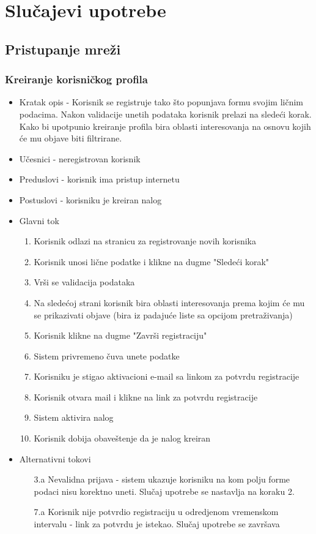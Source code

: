 \section{Slučajevi upotrebe}

\subsection{Pristupanje mreži}
\subsubsection{Kreiranje korisničkog profila}
\begin{itemize}
\item Kratak opis - Korisnik se registruje tako što popunjava formu svojim ličnim podacima. Nakon validacije unetih podataka korisnik prelazi na sledeći korak. Kako bi upotpunio kreiranje profila bira oblasti interesovanja na osnovu kojih će mu objave biti filtrirane.
\item Učesnici - neregistrovan korisnik
\item Preduslovi - korisnik ima pristup internetu
\item Postuslovi - korisniku je kreiran nalog
\item Glavni tok
	\begin{enumerate}
	\item Korisnik odlazi na stranicu za registrovanje novih korisnika
	\item Korisnik unosi lične podatke i klikne na dugme "Sledeći korak"
	\item Vrši se validacija podataka
	\item Na sledećoj strani korisnik bira oblasti interesovanja prema kojim će mu se prikazivati objave (bira iz padajuće liste sa opcijom pretraživanja)
	\item Korisnik klikne na dugme "Završi registraciju"
	\item Sistem privremeno čuva unete podatke
	\item Korisniku je stigao aktivacioni e-mail sa linkom za potvrdu registracije
	\item Korisnik otvara mail i klikne na link za potvrdu registracije
	\item Sistem aktivira nalog
	\item Korisnik dobija obaveštenje da je nalog kreiran
	\end{enumerate}
\item Alternativni tokovi
	\begin{itemize}
	\item[3.a] Nevalidna prijava - sistem ukazuje korisniku na kom polju forme podaci nisu korektno uneti. Slučaj upotrebe se nastavlja na koraku 2.
	\item[7.a] Korisnik nije potvrdio registraciju u odredjenom vremenskom intervalu - link za potvrdu je istekao. Slučaj upotrebe se završava
	\end{itemize}
\end{itemize}

